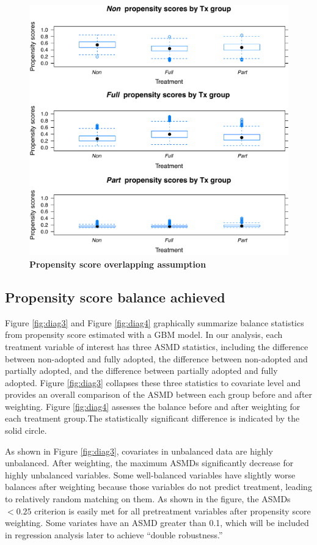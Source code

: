 \documentclass[12pt]{report}
\begin{document}
\begin{figure}[!htb]
\begin{center}
\includegraphics[width=\textwidth]{psdiag2.pdf}
\caption{{\bf Propensity score overlapping assumption}}
\label{fig:diag2}
\end{center}
\end{figure}

\subsection{Propensity score balance achieved}
Figure \ref{fig:diag3} and Figure \ref{fig:diag4} graphically summarize balance statistics from propensity score estimated with a GBM model. In our analysis, each treatment variable of interest has three ASMD statistics, including the difference between non-adopted and fully adopted, the difference between non-adopted and partially adopted, and the difference between partially adopted and fully adopted. Figure \ref{fig:diag3} collapses these three statistics to covariate level and provides an overall comparison of the ASMD between each group before and after weighting. Figure \ref{fig:diag4} assesses the balance before and after weighting for each treatment group.The statistically significant difference is indicated by the solid circle.

As shown in Figure \ref{fig:diag3}, covariates in unbalanced data are highly unbalanced. After weighting, the maximum ASMDs significantly decrease for highly unbalanced variables. Some well-balanced variables have slightly worse balances after weighting because those variables do not predict treatment, leading to relatively random matching on them. As shown in the figure, the ASMDs$<0.25$ criterion is easily met for all pretreatment variables after propensity score weighting. Some variates have an ASMD greater than 0.1, which will be included in regression analysis later to achieve ``double robustness.''
\end{document}
